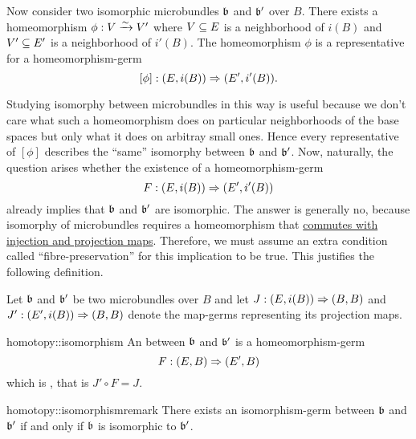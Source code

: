 \begin{myparagraph}
    Now consider two isomorphic microbundles $\mathfrak{b}$ and $\mathfrak{b}'$ over $B$.
    There exists a homeomorphism $\phi: V \xrightarrow{\sim} V'$ where $V \subseteq{} E$ is a neighborhood of $i(B)$ and $V' \subseteq{} E'$ is a neighborhood of $i'(B)$.
    The homeomorphism $\phi$ is a representative for a homeomorphism-germ
    \[ [\phi]: (E, i(B)) \Rightarrow{} (E', i'(B)). \]
    
    Studying isomorphy between microbundles in this way is useful because we don't care what such a
    homeomorphism does on particular neighborhoods of the base spaces but only what it does on arbitray small ones.
    Hence every representative of $[\phi]$ describes the ``same'' isomorphy between $\mathfrak{b}$ and $\mathfrak{b}'$.
    Now, naturally, the question arises whether the existence of a homeomorphism-germ
    \[ F: (E, i(B)) \Rightarrow{} (E', i'(B)) \]
    already implies that $\mathfrak{b}$ and $\mathfrak{b}'$ are isomorphic.
    The answer is generally no, because isomorphy of microbundles requires 
    a homeomorphism that \ul{commutes with injection and projection maps}.
    Therefore, we must assume an extra condition called ``fibre-preservation'' for this implication to be true.
    This justifies the following definition.
    
    Let $\mathfrak{b}$ and $\mathfrak{b}'$ be two microbundles over $B$ and
    let $J: (E, i(B)) \Rightarrow{} (B, B)$ and $J': (E', i(B)) \Rightarrow{} (B, B)$ denote the map-germs representing its projection maps.
\end{myparagraph}

\begin{mydefinition}{homotopy::isomorphism}
    An  between $\mathfrak{b}$ and $\mathfrak{b}'$ is a homeomorphism-germ 
    \[ F: (E, B) \Rightarrow{} (E', B) \]
    which is , that is $J' \circ F = J$.
\end{mydefinition}

\begin{myremark}{homotopy::isomorphismremark}
    There exists an isomorphism-germ between $\mathfrak{b}$ and $\mathfrak{b}'$ if and only if $\mathfrak{b}$ is isomorphic to $\mathfrak{b}'$.
\end{myremark}